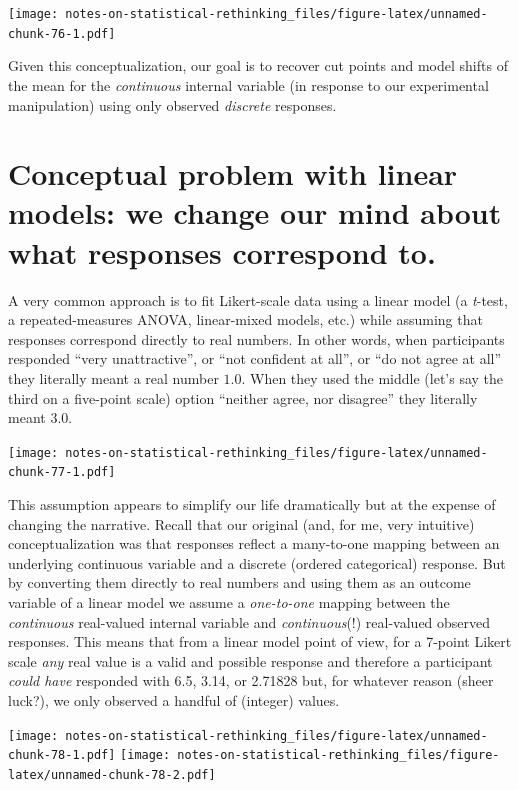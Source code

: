\documentclass[
]{book}
\begin{document}
\texttt{[image: notes-on-statistical-rethinking\_files/figure-latex/unnamed-chunk-76-1.pdf]}

Given this conceptualization, our goal is to recover cut points and model shifts of the mean for the \emph{continuous} internal variable (in response to our experimental manipulation) using only observed \emph{discrete} responses.

\hypertarget{conceptual-problem-with-linear-models-we-change-our-mind-about-what-responses-correspond-to.}{%
\section{Conceptual problem with linear models: we change our mind about what responses correspond to.}\label{conceptual-problem-with-linear-models-we-change-our-mind-about-what-responses-correspond-to.}}

A very common approach is to fit Likert-scale data using a linear model (a \emph{t}-test, a repeated-measures ANOVA, linear-mixed models, etc.) while assuming that responses correspond directly to real numbers. In other words, when participants responded ``very unattractive'', or ``not confident at all'', or ``do not agree at all'' they literally meant a real number \(1.0\). When they used the middle (let's say the third on a five-point scale) option ``neither agree, nor disagree'' they literally meant \(3.0\).

\texttt{[image: notes-on-statistical-rethinking\_files/figure-latex/unnamed-chunk-77-1.pdf]}

This assumption appears to simplify our life dramatically but at the expense of changing the narrative. Recall that our original (and, for me, very intuitive) conceptualization was that responses reflect a many-to-one mapping between an underlying continuous variable and a discrete (ordered categorical) response. But by converting them directly to real numbers and using them as an outcome variable of a linear model we assume a \emph{one-to-one} mapping between the \emph{continuous} real-valued internal variable and \emph{continuous}(!) real-valued observed responses. This means that from a linear model point of view, for a 7-point Likert scale \emph{any} real value is a valid and possible response and therefore a participant \emph{could have} responded with 6.5, 3.14, or 2.71828 but, for whatever reason (sheer luck?), we only observed a handful of (integer) values.

\texttt{[image: notes-on-statistical-rethinking\_files/figure-latex/unnamed-chunk-78-1.pdf]} \texttt{[image: notes-on-statistical-rethinking\_files/figure-latex/unnamed-chunk-78-2.pdf]}
\end{document}
